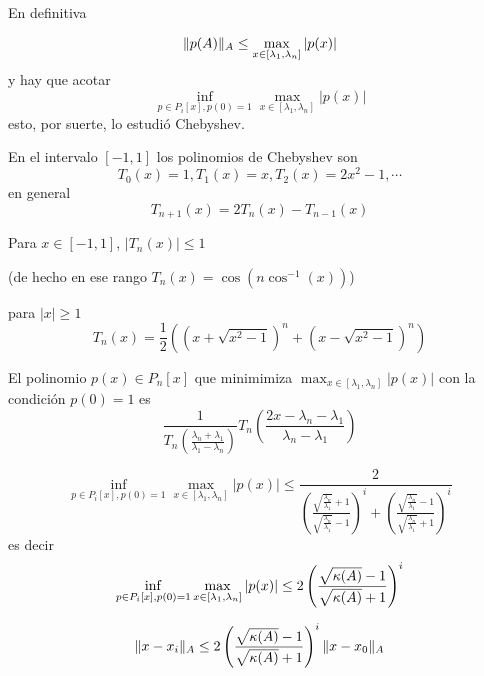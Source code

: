 En definitiva

$$
\|p(\Ab)\|_A\le  \max_{x\in [\lambda_1,\lambda_n]}|p(x)|
$$
y hay que acotar
$$
\inf_{p\in P_i[x],p(0)=1}\max_{x\in [\lambda_1,\lambda_n]}|p(x)|
$$
esto, por suerte, lo estudió Chebyshev.

En el intervalo $[-1,1]$ los polinomios de Chebyshev son
$$
T_0(x)=1,T_1(x)=x,T_2(x)=2x^2-1,\cdots
$$
en general
$$
T_{n+1}(x)=2T_{n}(x)-T_{n-1}(x)
$$

Para $x\in [-1,1]$, $|T_n(x)|\le 1$

(de hecho
en ese rango $T_n(x)=\cos(n\cos^{-1}(x))$)

para $|x|\ge 1$
$$
T_n(x)=\frac12\left((x+\sqrt{x^2-1})^n+ (x-\sqrt{x^2-1})^n\right)
$$


El polinomio $p(x)\in P_n[x]$ que minimimiza $\max_{x\in [\lambda_1,\lambda_n]}|p(x)|$ con la condición $p(0)=1$ es
$$
\frac{1}{T_n(\frac{\lambda_n+\lambda_1}{\lambda_1-\lambda_n})}T_n\left(\frac{2x-\lambda_n-\lambda_1}{\lambda_n-\lambda_1}\right)$$


$$
\inf_{p\in P_i[x],p(0)=1}\max_{x\in [\lambda_1,\lambda_n]}|p(x)|
\le \frac{2}{\left( \frac{\sqrt{\frac{\lambda_n}{\lambda_1}}+1}{\sqrt{\frac{\lambda_n}{\lambda_1}}-1}\right)^i+\left( \frac{\sqrt{\frac{\lambda_n}{\lambda_1}}-1}{\sqrt{\frac{\lambda_n}{\lambda_1}}+1}\right)^i}$$
es decir
$$
\inf_{p\in P_i[x],p(0)=1}\max_{x\in [\lambda_1,\lambda_n]}|p(x)|
\le 2\left(\frac{\sqrt{\kappa(\Ab)}-1}{\sqrt{\kappa(\Ab)}+1}\right)^i
$$

$$\|\xb-\xb_i\|_{A}\le 2\left(\frac{\sqrt{\kappa(\Ab)}-1}{\sqrt{\kappa(\Ab)}+1}\right)^i\|\xb-\xb_0\|_{A}$$


